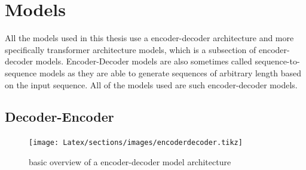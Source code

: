 \section{Models}
\label{ch:models}
All the models used in this thesis use a encoder-decoder architecture and more specifically transformer architecture models, which is a subsection of encoder-decoder models. Encoder-Decoder models are also sometimes called sequence-to-sequence models as they are able to generate sequences of arbitrary length based on the input sequence.
All of the models used are such encoder-decoder models. 

\subsection{Decoder-Encoder}
\begin{figure}[]
    \centering%
    \texttt{[image: Latex/sections/images/encoderdecoder.tikz]}
    \caption{basic overview of a encoder-decoder model architecture}
    \label{fig:encoderdecodermodel}
\end{figure}

